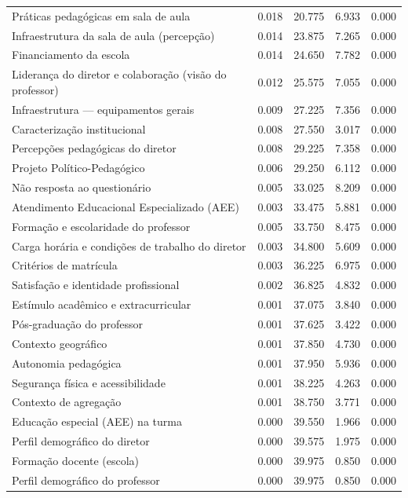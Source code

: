 \begin{tabular}{lrrrr}
Práticas pedagógicas em sala de aula & 0.018 & 20.775 & 6.933 & 0.000 \\
Infraestrutura da sala de aula (percepção) & 0.014 & 23.875 & 7.265 & 0.000 \\
Financiamento da escola & 0.014 & 24.650 & 7.782 & 0.000 \\
Liderança do diretor e colaboração (visão do professor) & 0.012 & 25.575 & 7.055 & 0.000 \\
Infraestrutura — equipamentos gerais & 0.009 & 27.225 & 7.356 & 0.000 \\
Caracterização institucional & 0.008 & 27.550 & 3.017 & 0.000 \\
Percepções pedagógicas do diretor & 0.008 & 29.225 & 7.358 & 0.000 \\
Projeto Político-Pedagógico & 0.006 & 29.250 & 6.112 & 0.000 \\
Não resposta ao questionário & 0.005 & 33.025 & 8.209 & 0.000 \\
Atendimento Educacional Especializado (AEE) & 0.003 & 33.475 & 5.881 & 0.000 \\
Formação e escolaridade do professor & 0.005 & 33.750 & 8.475 & 0.000 \\
Carga horária e condições de trabalho do diretor & 0.003 & 34.800 & 5.609 & 0.000 \\
Critérios de matrícula & 0.003 & 36.225 & 6.975 & 0.000 \\
Satisfação e identidade profissional & 0.002 & 36.825 & 4.832 & 0.000 \\
Estímulo acadêmico e extracurricular & 0.001 & 37.075 & 3.840 & 0.000 \\
Pós-graduação do professor & 0.001 & 37.625 & 3.422 & 0.000 \\
Contexto geográfico & 0.001 & 37.850 & 4.730 & 0.000 \\
Autonomia pedagógica & 0.001 & 37.950 & 5.936 & 0.000 \\
Segurança física e acessibilidade & 0.001 & 38.225 & 4.263 & 0.000 \\
Contexto de agregação & 0.001 & 38.750 & 3.771 & 0.000 \\
Educação especial (AEE) na turma & 0.000 & 39.550 & 1.966 & 0.000 \\
Perfil demográfico do diretor & 0.000 & 39.575 & 1.975 & 0.000 \\
Formação docente (escola) & 0.000 & 39.975 & 0.850 & 0.000 \\
Perfil demográfico do professor & 0.000 & 39.975 & 0.850 & 0.000 \\
\bottomrule
\end{tabular}
